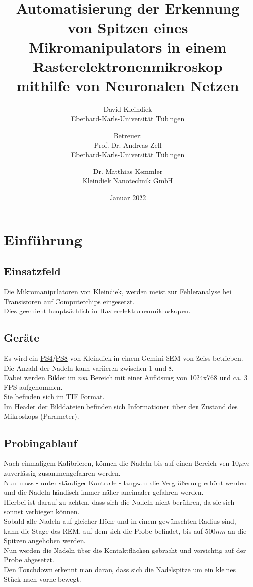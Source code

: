 \documentclass{article}
\title{Automatisierung der Erkennung von Spitzen eines Mikromanipulators in einem Rasterelektronenmikroskop mithilfe von Neuronalen Netzen}
\author{David Kleindiek\\ Eberhard-Karls-Universität Tübingen
\and Betreuer: \\ Prof. Dr. Andreas Zell \\ Eberhard-Karls-Universität Tübingen
\and Dr. Matthias Kemmler\\ Kleindiek Nanotechnik GmbH}
\date{Januar 2022}
\begin{document}
	
	\maketitle
	
	\section{Einführung}
	\subsection{Einsatzfeld}
	Die Mikromanipulatoren von Kleindiek, werden meist zur Fehleranalyse bei Transistoren auf Computerchips eingesetzt.\\
	Dies geschieht hauptsächlich in Rasterelektronenmikroskopen.
	\subsection{Geräte}
	Es wird ein \href{https://www.kleindiek.com/ps4.html}{PS4}/\href{https://www.kleindiek.com/ps8.html}{PS8} von Kleindiek in einem Gemini SEM von Zeiss betrieben.\\
	Die Anzahl der Nadeln kann variieren zwischen 1 und 8.\\
	Dabei werden Bilder im $nm$ Bereich mit einer Auflösung von 1024x768 und ca. 3 FPS aufgenommen.\\
	Sie befinden sich im TIF Format.\\
	Im Header der Bilddateien befinden sich Informationen über den Zustand des Mikroskops (Parameter).
	\subsection{Probingablauf}
	Nach einmaligem Kalibrieren, können die Nadeln bis auf einen Bereich von $10\mu m$ zuverlässig zusammengefahren werden.\\
	Nun muss - unter ständiger Kontrolle - langsam die Vergrößerung erhöht werden und die Nadeln händisch immer näher aneinader gefahren werden.\\
	Hierbei ist darauf zu achten, dass sich die Nadeln nicht berühren, da sie sich sonnst verbiegen können.\\
	Sobald alle Nadeln auf gleicher Höhe und in einem gewünschten Radius sind, kann die Stage des REM, auf dem sich die Probe befindet, bis auf $500 nm$ an die Spitzen angehoben werden.\\
	Nun werden die Nadeln über die Kontaktflächen gebracht und vorsichtig auf der Probe abgesetzt.\\
	Den Touchdown erkennt man daran, dass sich die Nadelspitze um ein kleines Stück nach vorne bewegt.
	
\end{document}
